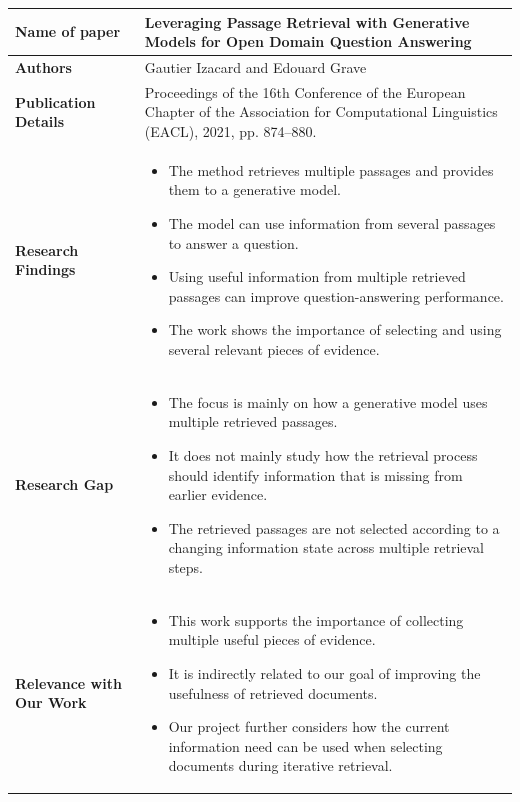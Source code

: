 \documentclass[12pt,a4paper]{report}
\begin{document}
\begin{longtable}{|p{1.25in}|p{5.15in}|}
\hline

\textbf{Name of paper} & Leveraging Passage Retrieval with Generative Models for Open Domain Question Answering \\ \hline

\textbf{Authors} & Gautier Izacard and Edouard Grave \\ \hline

\textbf{Publication Details} & Proceedings of the 16th Conference of the European Chapter of the Association for Computational Linguistics (EACL), 2021, pp. 874--880. \\ \hline

\textbf{Research Findings} &
\begin{itemize}[leftmargin=0.18in,itemsep=0.05in,topsep=0pt,parsep=0pt]
\item The method retrieves multiple passages and provides them to a generative model.
\item The model can use information from several passages to answer a question.
\item Using useful information from multiple retrieved passages can improve question-answering performance.
\item The work shows the importance of selecting and using several relevant pieces of evidence.
\end{itemize} \\ \hline

\textbf{Research Gap} &
\begin{itemize}[leftmargin=0.18in,itemsep=0.05in,topsep=0pt,parsep=0pt]
\item The focus is mainly on how a generative model uses multiple retrieved passages.
\item It does not mainly study how the retrieval process should identify information that is missing from earlier evidence.
\item The retrieved passages are not selected according to a changing information state across multiple retrieval steps.
\end{itemize} \\ \hline

\textbf{Relevance with Our Work} &
\begin{itemize}[leftmargin=0.18in,itemsep=0.05in,topsep=0pt,parsep=0pt]
\item This work supports the importance of collecting multiple useful pieces of evidence.
\item It is indirectly related to our goal of improving the usefulness of retrieved documents.
\item Our project further considers how the current information need can be used when selecting documents during iterative retrieval.
\end{itemize} \\ \hline
\end{longtable}
\clearpage
\end{document}
